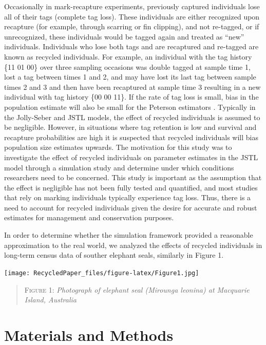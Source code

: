 \documentclass[12pt]{article}
\begin{document}
Occasionally in mark-recapture experiments, previously captured
individuals lose all of their tags (complete tag loss). These
individuals are either recognized upon recapture (for example, through
scarring or fin clipping), and not re-tagged, or if unrecognized, these
individuals would be tagged again and treated as ``new'' individuals.
Individuals who lose both tags and are recaptured and re-tagged are
known as recycled individuals. For example, an individual with the
 tag history \{11 01 00\} over three sampling occasions was
double tagged at sample time 1, lost a tag between times 1 and 2, and may have
lost its last tag between sample times 2 and 3 and then have been
recaptured at sample time 3 resulting in a new individual with
tag history \{00 00 11\}. If the rate of tag loss is small, bias in
the population estimate will also be small for the Peterson estimators
\citep{Seber:1981}. Typically in the Jolly-Seber and JSTL models, the
effect of recycled individuals is assumed to be negligible. However, in
situations where tag retention is low and survival and recapture
probabilities are high it is suspected that recycled individuals will
bias population size estimates upwards. The motivation for this study
was to investigate the effect of recycled individuals on parameter
estimates in the JSTL model through a simulation study and determine
under which conditions researchers need to be concerned.  This study is important as the assumption that the effect is negligible has not been fully tested and quantified, and most studies that rely on marking individuals typically experience tag loss. Thus, there is a need to account for recycled individuals given the desire for accurate and robust estimates for management and conservation purposes.

In order to determine whether the simulation framework provided a
reasonable approximation to the real world, we analyzed the effects of
recycled individuals in long-term census data of souther elephant seals, similarly in Figure 1. 

\texttt{[image: RecycledPaper\_files/figure-latex/Figure1.jpg]}

\begin{quote}
\textsc{Figure 1:}
\textsl{Photograph of elephant seal (\textit{Mirounga leonina}) at Macquarie Island, Australia}
\end{quote}

\section{Materials and Methods}\label{methods}
\end{document}
